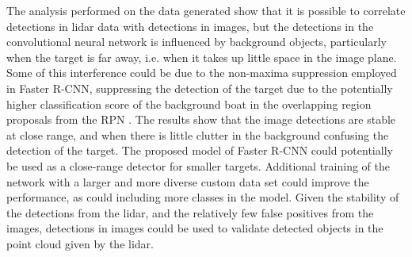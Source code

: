 The analysis performed on the data generated show that it is possible to correlate detections in lidar data with detections in images, but the detections in the convolutional neural network is influenced by background objects, particularly when the target is far away, i.e. when it takes up little space in the image plane. Some of this interference could be due to the non-maxima suppression employed in Faster R-CNN, suppressing the detection of the target due to the potentially higher classification score of the background boat in the overlapping region proposals from the RPN \cite{ren15fasterrcnn}. The results show that the image detections are stable at close range, and when there is little clutter in the background confusing the detection of the target. The proposed model of Faster R-CNN could potentially be used as a close-range detector for smaller targets. Additional training of the network with a larger and more diverse custom data set could improve the performance, as could including more classes in the model. Given the stability of the detections from the lidar, and the relatively few false positives from the images, detections in images could be used to validate detected objects in the point cloud given by the lidar.\\\vspace{2mm}\\

